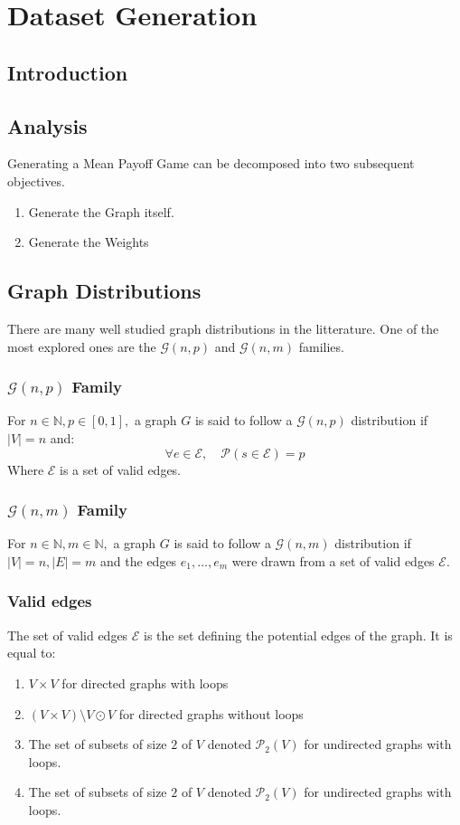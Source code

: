 \chapter{Dataset Generation}
\label{section:Dataset}

\section{Introduction}
\section{Analysis}
Generating a Mean Payoff Game can be decomposed into two subsequent objectives.
\begin{enumerate}
	\item Generate the Graph itself.
	\item Generate the Weights
\end{enumerate}


\section{Graph Distributions}
There are many well studied graph distributions in the litterature. \newline
One of the most explored ones are the $\mathcal{G}(n,p)$ and $\mathcal{G}(n,m)$ families.
\subsection{$\mathcal{G}(n,p)$ Family}
For $n\in\mathbb{N},p\in[0,1],$ a graph $G$ is said to follow a $\mathcal{G}(n,p)$ distribution if $\lvert V \rvert=n$ and:
$$
\forall e\in \mathscr{E}, \quad \mathscr{P}(s\in \mathcal{E})=p
$$
Where $\mathscr{E}$ is a set of valid edges. 

\subsection{$\mathcal{G}(n,m)$ Family}
For $n\in\mathbb{N},m\in\mathbb{N},$ a graph $G$ is said to follow a $\mathcal{G}(n,m)$ distribution if $\lvert V \rvert=n,\lvert  E \rvert=m$ and the edges $e_1,\dots,e_m$ were drawn from a set of valid edges $\mathscr{E}.$
\subsection{Valid edges}
The set of valid edges $\mathscr{E}$ is the set defining the potential edges of the graph. It is equal to:
\begin{enumerate}
	\item $V\times V$ for directed graphs with loops 
	\item $(V\times V)\setminus V\odot V$ for directed graphs without loops
	\item The set of subsets of size $2$ of $V$ denoted $\mathscr{P}_2(V)$ for undirected graphs with loops.
	\item The set of subsets of size $2$ of $V$ denoted $\mathscr{P}_2(V)$ for undirected graphs with loops.
\end{enumerate}
